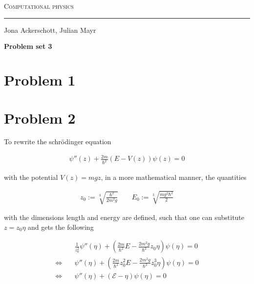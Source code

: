 \documentclass[12pt, a4paper]{article}
\begin{document}
  \centerline{\Huge\scshape Computational physics}
  \vspace*{0.5cm}
  \hrule
  \vspace*{0.5cm}
  \centerline{Jona Ackerschott, Julian Mayr}
  \vspace*{1cm}
  \centerline{\Large\bfseries Problem set 3}
  \vspace*{0.5cm}

  \section*{Problem 1}

  \section*{Problem 2}
  To rewrite the schrödinger equation

  \begin{align}
    \psi''(z) + \frac{2 m}{\hbar^2} (E - V(z)) \psi(z) = 0
  \end{align}

  \noindent
  with the potential $V(z) = m g z$, in a more mathematical manner, the quantities

  \begin{align}
    z_0 := \sqrt[3]{\frac{\hbar^2}{2 m^2 g}} \qquad E_0 := \sqrt[3]{\frac{m g^2 \hbar^2}{2}}
  \end{align}

  \noindent
  with the dimensions length and energy are defined, such that one can substitute $z = z_0 \eta$ and gets the following

  \begin{align}
    & \frac{1}{z_0^2} \psi''(\eta) + \left(\frac{2 m}{\hbar^2} E - \frac{2 m^2 g}{\hbar^2} z_0 \eta \right) \psi(\eta) = 0
    \nonumber \\
    \Leftrightarrow \quad & \psi''(\eta) + \left( \frac{2 m}{\hbar^2} z_0^2 E - \frac{2 m^2 g}{\hbar^2} z_0^3 \eta \right) \psi(\eta) = 0 \nonumber \\
    \Leftrightarrow \quad & \psi''(\eta) + \left( \mathcal{E} - \eta \right) \psi(\eta) = 0
    \label{eq_schrd}
  \end{align}
\end{document}
